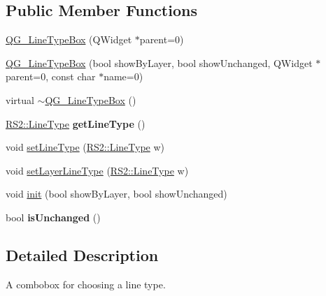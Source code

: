 \subsection*{Public Member Functions}
\begin{DoxyCompactItemize}
\item 
\hyperlink{classQG__LineTypeBox_a012d67e9fa36faa05d4701f79d5e0253}{Q\-G\-\_\-\-Line\-Type\-Box} (Q\-Widget $\ast$parent=0)
\item 
\hyperlink{classQG__LineTypeBox_a8135e7ee1e2172f935c22eb86fd68e79}{Q\-G\-\_\-\-Line\-Type\-Box} (bool show\-By\-Layer, bool show\-Unchanged, Q\-Widget $\ast$parent=0, const char $\ast$name=0)
\item 
virtual \hyperlink{classQG__LineTypeBox_a18b83dfe402ead2cd7448b1cb55650a9}{$\sim$\-Q\-G\-\_\-\-Line\-Type\-Box} ()
\item 
\hypertarget{classQG__LineTypeBox_a5fe687938cfc62a1e8a1d5dfa6e414f2}{\hyperlink{classRS2_a6f3a82972c2d62456f6cacb74e14c95f}{R\-S2\-::\-Line\-Type} {\bfseries get\-Line\-Type} ()}\label{classQG__LineTypeBox_a5fe687938cfc62a1e8a1d5dfa6e414f2}

\item 
void \hyperlink{classQG__LineTypeBox_ab77b4f9585c4998c931cb0a348206494}{set\-Line\-Type} (\hyperlink{classRS2_a6f3a82972c2d62456f6cacb74e14c95f}{R\-S2\-::\-Line\-Type} w)
\item 
void \hyperlink{classQG__LineTypeBox_ac3569be5207581a572548b91f3ac5bc6}{set\-Layer\-Line\-Type} (\hyperlink{classRS2_a6f3a82972c2d62456f6cacb74e14c95f}{R\-S2\-::\-Line\-Type} w)
\item 
void \hyperlink{classQG__LineTypeBox_a82fe832ea6a2b5c2a415aa848162fe2c}{init} (bool show\-By\-Layer, bool show\-Unchanged)
\item 
\hypertarget{classQG__LineTypeBox_a8325e8676625eebac74ddd8d50fa48d7}{bool {\bfseries is\-Unchanged} ()}\label{classQG__LineTypeBox_a8325e8676625eebac74ddd8d50fa48d7}

\end{DoxyCompactItemize}


\subsection{Detailed Description}
A combobox for choosing a line type. 

